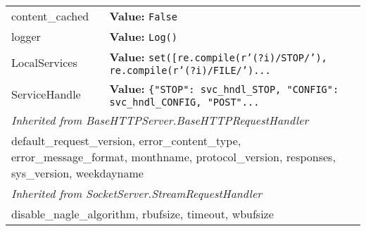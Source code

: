 \begin{longtable}{|p{\varnamewidth}|p{\vardescrwidth}|l}
\raggedright c\-o\-n\-t\-e\-n\-t\-\_\-c\-a\-c\-h\-e\-d\- & \raggedright \textbf{Value:} 
{\tt False}&\\
\cline{1-2}
\raggedright l\-o\-g\-g\-e\-r\- & \raggedright \textbf{Value:} 
{\tt Log()}&\\
\cline{1-2}
\raggedright L\-o\-c\-a\-l\-S\-e\-r\-v\-i\-c\-e\-s\- & \raggedright \textbf{Value:} 
{\tt \texttt{set([}re.compile(r'\texttt{(?i)}/STOP/')\texttt{, }re.compile(r'\texttt{(?i)}/FILE/')\texttt{...}}&\\
\cline{1-2}
\raggedright S\-e\-r\-v\-i\-c\-e\-H\-a\-n\-d\-l\-e\- & \raggedright \textbf{Value:} 
{\tt \{"STOP": svc\_hndl\_STOP, "CONFIG": svc\_hndl\_CONFIG, "POST"\texttt{...}}&\\
\cline{1-2}
\multicolumn{2}{|l|}{\textit{Inherited from BaseHTTPServer.BaseHTTPRequestHandler}}\\
\multicolumn{2}{|p{\varwidth}|}{\raggedright default\_request\_version, error\_content\_type, error\_message\_format, monthname, protocol\_version, responses, sys\_version, weekdayname}\\
\cline{1-2}
\multicolumn{2}{|l|}{\textit{Inherited from SocketServer.StreamRequestHandler}}\\
\multicolumn{2}{|p{\varwidth}|}{\raggedright disable\_nagle\_algorithm, rbufsize, timeout, wbufsize}\\
\cline{1-2}
\end{longtable}


